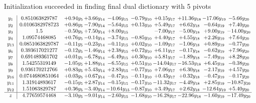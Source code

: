 \documentclass[8pt]{article}
\begin{document}
Initialization succeeded in finding final dual dictionary with 5 pivots
\[\begin{array}{c| c c@{\hskip 2pt} c@{\hskip 2pt} c@{\hskip 2pt} c@{\hskip 2pt} c@{\hskip 2pt} c@{\hskip 2pt} c@{\hskip 2pt} c@{\hskip 2pt} }
 y_{1}   &  0.851063829787 & +  0.94 y_{5} & +  3.66 y_{14} & -4.06 y_{15} & -0.79 y_{10} & +  0.15 y_{17} & + 11.36 y_{18} & -17.06 y_{19} & -5.66 y_{20}\\
 y_{2}   &  0.0106382978723 & +  0.86 y_{5} & -7.90 y_{14} & -5.64 y_{15} & +  0.13 y_{10} & +  5.49 y_{17} & +  6.62 y_{18} & -0.64 y_{19} & +  7.40 y_{20}\\
 y_{3}   &  1.5 & -0.50 y_{5} & +  7.50 y_{14} & +  8.00 y_{15} &   & -7.00 y_{17} & -5.00 y_{18} & +  9.00 y_{19} & -14.00 y_{20}\\
 y_{4}   &  1.09574468085 & +  0.76 y_{5} & -0.14 y_{14} & -3.74 y_{15} & -0.85 y_{10} & +  4.40 y_{17} & +  4.55 y_{18} & +  2.26 y_{19} & +  7.64 y_{20}\\
 y_{13}   &  0.0851063829787 & -0.11 y_{5} & -0.23 y_{14} & -0.11 y_{15} & +  0.02 y_{10} & -1.09 y_{17} & -1.06 y_{18} & +  0.89 y_{19} & -0.77 y_{20}\\
 y_{6}   &  0.393617021277 & -0.12 y_{5} & -1.46 y_{14} & +  2.38 y_{15} & +  0.72 y_{10} & +  6.11 y_{17} & -0.17 y_{18} & -0.62 y_{19} & +  7.96 y_{20}\\
 y_{7}   &  0.691489361702 & +  0.01 y_{5} & -6.78 y_{14} & -6.49 y_{15} & +  0.30 y_{10} & +  5.81 y_{17} & -1.89 y_{18} & -7.49 y_{19} & +  8.28 y_{20}\\
 y_{8}   &  1.54255319149 & -1.05 y_{5} & +  1.88 y_{14} & -6.55 y_{15} & +  0.51 y_{10} & -14.04 y_{17} & -16.53 y_{18} & +  6.45 y_{19} & -0.38 y_{20}\\
 y_{9}   &  0.936170212766 & +  0.83 y_{5} & +  5.43 y_{14} & +  2.83 y_{15} & -0.77 y_{10} & +  7.06 y_{17} & +  6.30 y_{18} & -2.17 y_{19} & +  4.57 y_{20}\\
 y_{16}   &  0.0744680851064 & +  0.03 y_{5} & +  0.67 y_{14} & -0.47 y_{15} & -0.11 y_{10} & +  0.43 y_{17} & +  0.32 y_{18} & -0.47 y_{19} & -0.17 y_{20}\\
 y_{11}   &  1.31914893617 & -0.15 y_{5} & +  2.87 y_{14} & -0.15 y_{15} & -0.17 y_{10} & -11.32 y_{17} & -4.49 y_{18} & +  2.85 y_{19} & -10.87 y_{20}\\
 y_{12}   &  1.51063829787 & +  0.36 y_{5} & -3.40 y_{14} & -10.64 y_{15} & -0.87 y_{10} & +  3.49 y_{17} & +  2.62 y_{18} & -12.64 y_{19} & +  5.40 y_{20}\\
\hline
z    &  4.77659574468 & -3.10 y_{5} & -9.01 y_{14} & -2.60 y_{15} & -1.68 y_{10} & -16.28 y_{17} & -22.96 y_{18} & -1.60 y_{19} & -17.49 y_{20}\\
\end{array}\]
\end{document}
